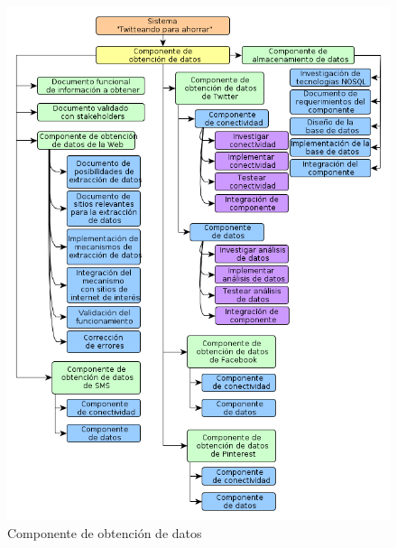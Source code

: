 \begin{figure}[H]
\centering
\includegraphics[scale=\escaladefault]{graficos/wbs/comp_obtencion_datos.png}
\caption{Componente de obtención de datos}
\end{figure}

